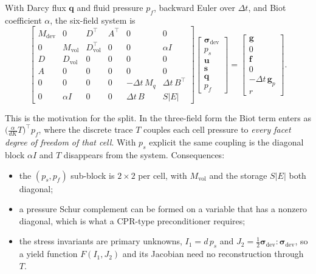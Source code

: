 \documentclass[11pt,a4paper]{article}
\newcommand{\dev}{\mathrm{dev}}
\newcommand{\bsig}{\boldsymbol{\sigma}}
\newcommand{\bu}{\boldsymbol{u}}
\newcommand{\bq}{\boldsymbol{q}}
\theoremstyle{plain}
\theoremstyle{remark}
\begin{document}
With Darcy flux $\bq$ and fluid pressure $p_f$, backward Euler over $\Delta t$,
and Biot coefficient $\alpha$, the six-field system is
\begin{equation}
  \begin{bmatrix}
    M_{\dev} & 0 & D^{\!\top} & A^{\!\top} & 0 & 0\\
    0 & M_{\mathrm{vol}} & D_{\mathrm{vol}}^{\!\top} & 0 & 0 & \alpha I\\
    D & D_{\mathrm{vol}} & 0 & 0 & 0 & 0\\
    A & 0 & 0 & 0 & 0 & 0\\
    0 & 0 & 0 & 0 & -\Delta t\,M_q & \Delta t\,B^{\!\top}\\
    0 & \alpha I & 0 & 0 & \Delta t\,B & S|E|
  \end{bmatrix}
  \begin{bmatrix}
    \bsig_{\dev}\\ p_s\\ \bu\\ \boldsymbol{s}\\ \bq\\ p_f
  \end{bmatrix}
  =
  \begin{bmatrix}
    \boldsymbol{g}\\ 0\\ \boldsymbol{f}\\ 0\\ -\Delta t\,\boldsymbol{g}_p\\ r
  \end{bmatrix}.
  \label{eq:sixfield}
\end{equation}

This is the motivation for the split. In the three-field form the Biot term
enters as $\bigl(\tfrac{\alpha}{dK}T\bigr)^{\!\top}p_f$, where the discrete
trace $T$ couples each cell pressure to \emph{every facet degree of freedom of
that cell}. With $p_s$ explicit the same coupling is the diagonal block
$\alpha I$ and $T$ disappears from the system. Consequences:
\begin{itemize}
  \item the $(p_s,p_f)$ sub-block is $2\times2$ per cell, with
        $M_{\mathrm{vol}}$ and the storage $S|E|$ both diagonal;
  \item a pressure Schur complement can be formed on a variable that has a
        nonzero diagonal, which is what a CPR-type preconditioner requires;
  \item the stress invariants are primary unknowns, $I_1 = d\,p_s$ and
        $J_2 = \tfrac12\bsig_{\dev}\!:\!\bsig_{\dev}$, so a yield function
        $F(I_1,J_2)$ and its Jacobian need no reconstruction through $T$.
\end{itemize}
\end{document}
